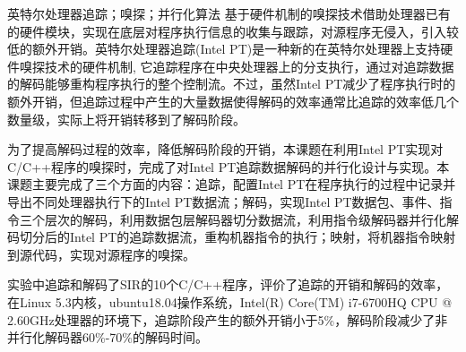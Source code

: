 
\begin{cnabstract}{英特尔处理器追踪；嗅探；并行化算法}
  基于硬件机制的嗅探技术借助处理器已有的硬件模块，实现在底层对程序执行信息的收集与跟踪，对源程序无侵入，引入较低的额外开销。英特尔处理器追踪(Intel PT)是一种新的在英特尔处理器上支持硬件嗅探技术的硬件机制, 它追踪程序在中央处理器上的分支执行，通过对追踪数据的解码能够重构程序执行的整个控制流。不过，虽然Intel PT减少了程序执行时的额外开销，但追踪过程中产生的大量数据使得解码的效率通常比追踪的效率低几个数量级，实际上将开销转移到了解码阶段。

  为了提高解码过程的效率，降低解码阶段的开销，本课题在利用Intel PT实现对C/C++程序的嗅探时，完成了对Intel PT追踪数据解码的并行化设计与实现。本课题主要完成了三个方面的内容：追踪，配置Intel PT在程序执行的过程中记录并导出不同处理器执行下的Intel PT数据流；解码，实现Intel PT数据包、事件、指令三个层次的解码，利用数据包层解码器切分数据流，利用指令级解码器并行化解码切分后的Intel PT的追踪数据流，重构机器指令的执行；映射，将机器指令映射到源代码，实现对源程序的嗅探。

  实验中追踪和解码了SIR的10个C/C++程序，评价了追踪的开销和解码的效率，在Linux 5.3内核，ubuntu18.04操作系统，Intel(R) Core(TM) i7-6700HQ CPU @ 2.60GHz处理器的环境下，追踪阶段产生的额外开销小于5\%，解码阶段减少了非并行化解码器60\%-70\%的解码时间。
\end{cnabstract}


